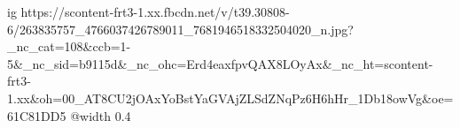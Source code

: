  
 
 
 
 

\ifcmt
  ig https://scontent-frt3-1.xx.fbcdn.net/v/t39.30808-6/263835757_4766037426789011_7681946518332504020_n.jpg?_nc_cat=108&ccb=1-5&_nc_sid=b9115d&_nc_ohc=Erd4eaxfpvQAX8LOyAx&_nc_ht=scontent-frt3-1.xx&oh=00_AT8CU2jOAxYoBstYaGVAjZLSdZNqPz6H6hHr_1Db18owVg&oe=61C81DD5
  @width 0.4
\fi
